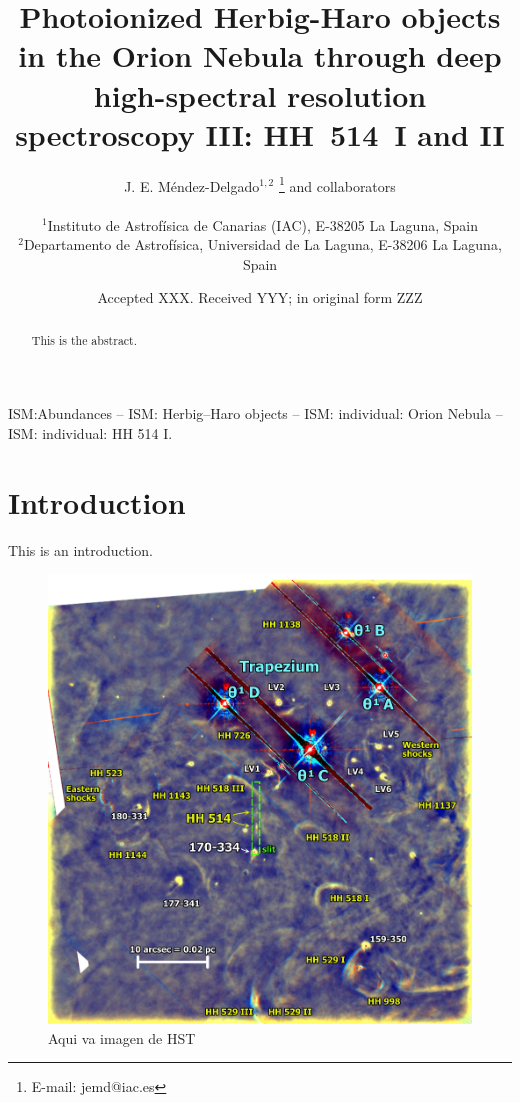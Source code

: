 \documentclass[fleqn,usenatbib]{mnras}
\title[HH~514~I and II in the Orion Nebula]{Photoionized Herbig-Haro objects in the Orion Nebula through deep high-spectral resolution spectroscopy III: HH~514~I and II}
\author[J. E. M\'endez-Delgado et al.]
{J. E. M\'endez-Delgado$^{1,2}$ \thanks{E-mail: jemd@iac.es} and collaborators\\
\\
$^{1}$Instituto de Astrof\'isica de Canarias (IAC), E-38205 La Laguna, Spain\\
$^{2}$Departamento de Astrof\'isica, Universidad de La Laguna, E-38206 La Laguna, Spain}
\date{Accepted XXX. Received YYY; in original form ZZZ}
\begin{document}
\label{firstpage}
\pagerange{\pageref{firstpage}--\pageref{lastpage}}
\maketitle

\begin{abstract}
This is the abstract. 
\end{abstract}

\begin{keywords}
ISM:Abundances – ISM: Herbig–Haro objects – ISM: individual:
Orion Nebula – ISM: individual: HH 514 I.
\end{keywords}



\section{Introduction}
\label{sec:introduction}
This is an introduction.

\begin{figure}
\includegraphics[width=\textwidth]{hh514-finding}
\caption{Aqui va imagen de HST}
\label{fig:hst}
\end{figure} 
\end{document}
